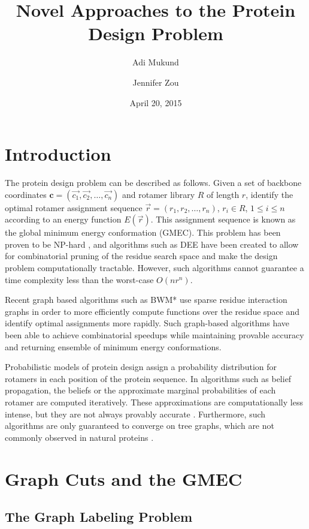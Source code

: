 \documentclass[11pt]{article}
\title{\textbf{Novel Approaches to the Protein Design Problem}}
\author{Adi Mukund \and Jennifer Zou}
\date{April 20, 2015}
\begin{document}
	
	\maketitle
	
	\section{Introduction}
	The protein design problem can be described as follows. Given a set of 
	backbone coordinates $\mathbf{c} = (\vec{c_1}, \vec{c_2 }, \dots, \vec{c_n})$
	and rotamer library $R$ of length $r$, identify the optimal rotamer
	assignment sequence $\vec{r} = (r_1, r_2,\dots, r_n)$, $r_i \in R$, 
	$1 \leq i \leq n$ according to an energy function $E(\vec{r})$. This assignment
	sequence is known as the global minimum energy conformation (GMEC). 
	This problem has been proven to be NP-hard \cite{PW02}, and algorithms such 
	as DEE \cite{BD97} have been created to allow for combinatorial pruning of 
	the residue search space and make the design problem computationally tractable.
	However, such algorithms cannot guarantee a time complexity less than the 
	worst-case $O(nr^n)$. 
	
	Recent graph based algorithms such as BWM* \cite{DJJG15} use sparse residue 
	interaction graphs in order to more efficiently compute functions over the residue
	space and identify optimal assignments more rapidly. Such graph-based algorithms
	have been able to achieve combinatorial speedups while maintaining provable
	accuracy and returning ensemble of minimum energy conformations. 	
	
	Probabilistic models of protein design assign a probability distribution 
	for rotamers in each position of the protein sequence.  In algorithms such as
	belief propagation, the beliefs or the approximate marginal probabilities
	of each rotamer are computed iteratively.  These approximations are computationally
	less intense, but they are not always provably accurate \cite{KLX08}. Furthermore,
	such algorithms are only guaranteed to converge on tree graphs, which are not
	commonly observed in natural proteins \cite{FLY09}. 

	\section{Graph Cuts and the GMEC}
	
	\subsection{The Graph Labeling Problem}
	
\end{document}
